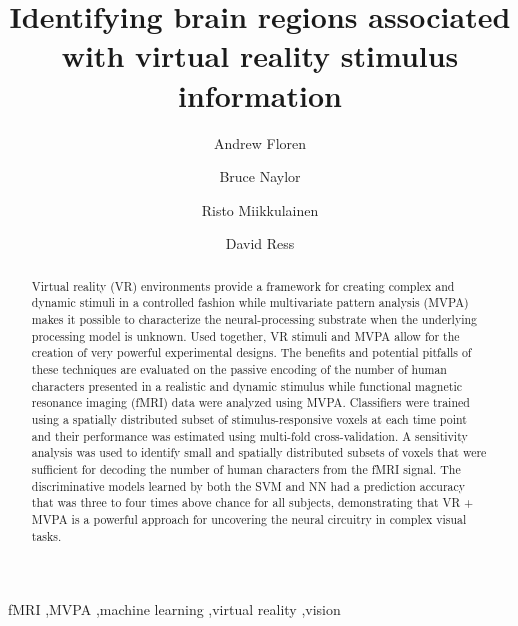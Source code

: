 \documentclass[5p,authoryear]{elsarticle}
\begin{document}
\begin{frontmatter}

\title{Identifying brain regions associated with virtual reality stimulus information}

\author[ECE,NS]{Andrew Floren}

\author[NS]{Bruce Naylor}

\author[CS]{Risto Miikkulainen}

\author[BCM]{David Ress}

\address[ECE]{Department of Electrical and Computer Engineering}
\address[NS]{Department of Neuroscience}
\address[CS]{Computer Science Department \\ The University of Texas at Austin, Austin, TX 78712 USA}
\address[BCM]{Department of Neuroscience \\ Baylor College of Medicine, Houston, TX 77030 USA}


\begin{abstract}
Virtual reality (VR) environments provide a framework for creating complex and dynamic stimuli in a controlled fashion while multivariate pattern analysis (MVPA) makes it possible to characterize the neural-processing substrate when the underlying processing model is unknown. 
Used together, VR stimuli and MVPA allow for the creation of very powerful experimental designs. 
The benefits and potential pitfalls of these techniques are evaluated on the passive encoding of the number of human characters presented in a realistic and dynamic stimulus while functional magnetic resonance imaging (fMRI) data were analyzed using MVPA. 
Classifiers were trained using a spatially distributed subset of stimulus-responsive voxels at each time point and their performance was estimated using multi-fold cross-validation.
A sensitivity analysis was used to identify small and spatially distributed subsets of voxels that were sufficient for decoding the number of human characters from the fMRI signal.
The discriminative models learned by both the SVM and NN had a prediction accuracy that was three to four times above chance for all subjects, demonstrating that VR + MVPA is a powerful approach for uncovering the neural circuitry in complex visual tasks.
\end{abstract}

\begin{keyword}
fMRI \sep MVPA \sep machine learning \sep virtual reality \sep vision
\end{keyword}

\end{frontmatter}
\end{document}
